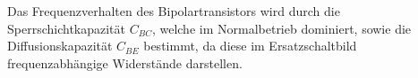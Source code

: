 Das Frequenzverhalten des Bipolartransistors wird durch die
Sperrschichtkapazität $C_{BC}$, welche im Normalbetrieb dominiert, sowie die
Diffusionskapazität $C_{BE}$ bestimmt, da diese im Ersatzschaltbild
frequenzabhängige Widerstände darstellen. 